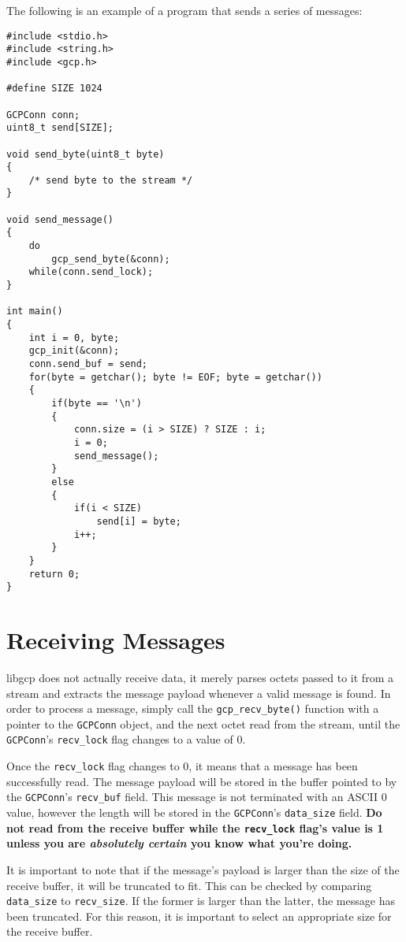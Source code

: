 \documentclass{article}
\begin{document}
The following is an example of a program that sends a series of
messages:
\begin{verbatim}
#include <stdio.h>
#include <string.h>
#include <gcp.h>

#define SIZE 1024

GCPConn conn;
uint8_t send[SIZE];

void send_byte(uint8_t byte)
{
    /* send byte to the stream */
}

void send_message()
{
    do
        gcp_send_byte(&conn);
    while(conn.send_lock);
}

int main()
{
    int i = 0, byte;
    gcp_init(&conn);
    conn.send_buf = send;
    for(byte = getchar(); byte != EOF; byte = getchar())
    {
        if(byte == '\n')
        {
            conn.size = (i > SIZE) ? SIZE : i;
            i = 0;
            send_message();
        }
        else
        {
            if(i < SIZE)
                send[i] = byte;
            i++;
        }
    }
    return 0;
}
\end{verbatim}

\section{Receiving Messages}
libgcp does not actually receive data, it merely parses octets passed
to it from a stream and extracts the message payload whenever a valid
message is found.  In order to process a message, simply call the
\texttt{gcp\_recv\_byte()} function with a pointer to the
\texttt{GCPConn} object, and the next octet read from the stream,
until the \texttt{GCPConn}'s \texttt{recv\_lock} flag changes to a
value of 0.

Once the \texttt{recv\_lock} flag changes to 0, it means that a
message has been successfully read.  The message payload will be
stored in the buffer pointed to by the \texttt{GCPConn}'s
\texttt{recv\_buf} field.  This message is not terminated with an
ASCII 0 value, however the length will be stored in the
\texttt{GCPConn}'s \texttt{data\_size} field.  \textbf{Do not read
  from the receive buffer while the \texttt{recv\_lock} flag's value
  is 1 unless you are \emph{absolutely certain} you know what you're
  doing.}

It is important to note that if the message's payload is larger than
the size of the receive buffer, it will be truncated to fit.  This can
be checked by comparing \texttt{data\_size} to \texttt{recv\_size}.
If the former is larger than the latter, the message has been
truncated. For this reason, it is important to select an appropriate
size for the receive buffer.
\end{document}

